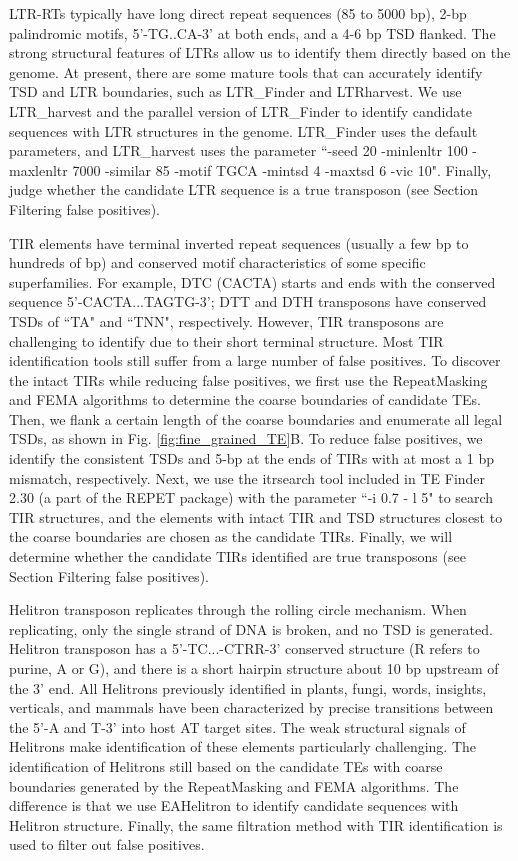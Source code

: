 \documentclass{bmcart}
\begin{document}
LTR-RTs typically have long direct repeat sequences (85 to 5000 bp), 2-bp palindromic motifs, 5'-TG..CA-3' at both ends, and a 4-6 bp TSD flanked. The strong structural features of LTRs allow us to identify them directly based on the genome. At present, there are some mature tools that can accurately identify TSD and LTR boundaries, such as LTR\_Finder and LTRharvest. We use LTR\_harvest and the parallel version of LTR\_Finder\cite{ou2019ltr_finder_parallel} to identify candidate sequences with LTR structures in the genome. LTR\_Finder uses the default parameters, and LTR\_harvest uses the parameter ``-seed 20 -minlenltr 100 -maxlenltr 7000 -similar 85 -motif TGCA -mintsd 4 -maxtsd 6 -vic 10".  Finally, judge whether the candidate LTR sequence is a true transposon (see Section Filtering false positives).

TIR elements have terminal inverted repeat sequences (usually a few bp to hundreds of bp) and conserved motif characteristics of some specific superfamilies. For example, DTC (CACTA) starts and ends with the conserved sequence 5'-CACTA...TAGTG-3'; DTT and DTH transposons have conserved TSDs of ``TA" and ``TNN", respectively. However, TIR transposons are challenging to identify due to their short terminal structure. Most TIR identification tools still suffer from a large number of false positives. To discover the intact TIRs while reducing false positives, we first use the RepeatMasking and FEMA algorithms to determine the coarse boundaries of candidate TEs. Then, we flank a certain length of the coarse boundaries and enumerate all legal TSDs, as shown in Fig. \ref{fig:fine_grained_TE}B. To reduce false positives, we identify the consistent TSDs and 5-bp at the ends of TIRs with at most a 1 bp mismatch, respectively. Next, we use the itrsearch tool included in TE Finder 2.30 (a part of the REPET\cite{quesneville2010repet} package) with the parameter ``-i 0.7 - l 5" to search TIR structures, and the elements with intact TIR and TSD structures closest to the coarse boundaries are chosen as the candidate TIRs. Finally, we will determine whether the candidate TIRs identified are true transposons (see Section Filtering false positives). 

Helitron transposon replicates through the rolling circle mechanism. When replicating, only the single strand of DNA is broken, and no TSD is generated. Helitron transposon has a 5'-TC...-CTRR-3' conserved structure (R refers to purine, A or G), and there is a short hairpin structure about 10 bp upstream of the 3' end. All Helitrons previously identified in plants, fungi, words, insights, verticals, and mammals have been characterized by precise transitions between the 5'-A and T-3' into host AT target sites\cite{kapitonov2007helitrons}. The weak structural signals of Helitrons make identification of these elements particularly challenging. The identification of Helitrons still based on the candidate TEs with coarse boundaries generated by the RepeatMasking and FEMA algorithms. The difference is that we use EAHelitron\cite{hu2019helitron} to identify candidate sequences with Helitron structure. Finally, the same filtration method with TIR identification is used to filter out false positives.
\end{document}
